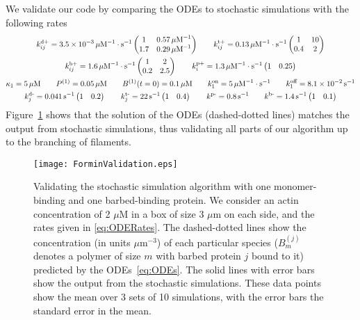 \documentclass[11pt]{article}
\renewcommand{\j}[1]{{#1}^{(j)}}
\begin{document}
\begin{appendices}
We validate our code by comparing the ODEs to stochastic simulations with the following rates
\begin{gather}
\nonumber
k^\text{d+}_{ij} = 3.5 \times 10^{-3} \, \mu \textrm{M}^{-1} \cdot \text{s}^{-1} \begin{pmatrix} 1 & 0.57 \, \mu \textrm{M}^{-1} \\ 1.7 & 0.29  \, \mu \textrm{M}^{-1}\end{pmatrix} \qquad 
k^\text{t+}_{ij} = 0.13 \, \mu \textrm{M}^{-1} \cdot \text{s}^{-1} \begin{pmatrix} 1 & 10 \\ 0.4 & 2\end{pmatrix} \\ \label{eq:ODERates}
k^\text{b+}_{ij} = 1.6 \, \mu \textrm{M}^{-1} \cdot \text{s}^{-1} \begin{pmatrix} 1 & 2 \\ 0.2 & 2.5\end{pmatrix} \qquad k^\text{p+}_i = 1.3 \, \mu \textrm{M}^{-1} \cdot \text{s}^{-1} \begin{pmatrix} 1 & 0.25 \end{pmatrix}\\ \nonumber
\kappa_1 = 5 \, \mu \text{M} \qquad P^{(1)}=0.05 \, \mu \text{M} \qquad B^{(1)}(t=0)= 0.1 \, \mu \text{M}\qquad   k^\text{on}_1 = 5 \, \mu \textrm{M}^{-1} \cdot\text{s}^{-1}\qquad k^\text{off}_1 = 8.1 \times 10^{-2} \, \text{s}^{-1}  \\ \nonumber
k^\text{d-}_j = 0.041 \, \text{s}^{-1} \begin{pmatrix} 1 & 0.2 \end{pmatrix} \qquad 
k^\text{t-}_j = 22 \, \text{s}^{-1} \begin{pmatrix} 1 & 0.4 \end{pmatrix}\qquad 
k^\text{p-} = 0.8 \, \text{s}^{-1} \qquad k^\text{b-} = 1.4 \, \text{s}^{-1}\begin{pmatrix} 1 & 0.1 \end{pmatrix}
\end{gather}
Figure\ \ref{fig:ForminValid} shows that the solution of the ODEs (dashed-dotted lines) matches the output from stochastic simulations, thus validating all parts of our algorithm up to the branching of filaments. 

\begin{figure}
\centering
\texttt{[image: ForminValidation.eps]}
\caption{\label{fig:ForminValid}Validating the stochastic simulation algorithm with one monomer-binding and one barbed-binding protein. We consider an actin concentration of 2 $\mu$M in a box of size 3 $\mu$m on each side, and the rates given in \eqref{eq:ODERates}. The dashed-dotted lines show the concentration (in units $\mu$m$^{-3}$) of each particular species ($\j B_m$ denotes a polymer of size $m$ with barbed protein $j$ bound to it) predicted by the ODEs\ \eqref{eq:ODEs}. The solid lines with error bars show the output from the stochastic simulations. These data points show the mean over 3 sets of 10 simulations, with the error bars the standard error in the mean.   }
\end{figure}


\end{appendices}
\end{document}
